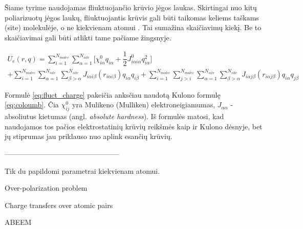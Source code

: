 Šiame tyrime naudojamas fliuktuojančio krūvio jėgos laukas.
Skirtingai nuo kitų poliarizuotų jėgos laukų, fliuktuojantis krūvis gali būti taikomas keliems taškams (site) molekulėje, o ne kiekvienam atomui \cite{polar}.
Tai sumažina skaičiavimų kiekį. Be to skaičiavimai gali būti atlikti tame pačiame žingsnyje.

\begin{multline} \label{eq:fluct_charge}
U_{e}(r, q) = \sum\limits_{i=1}^{N_{molec}} \sum\limits_{\alpha=1}^{N_{site}}
{\bigg[\chi_{i\alpha}^0 q_{i\alpha} + \dfrac{1} {2} J_{i\alpha i\alpha}^0 q_{i\alpha}^2 \bigg]} \\
+ \sum\limits_{i=1}^{N_{molec}} \sum\limits_{\alpha=1}^{N_{site}} \sum\limits_{\beta>\alpha}^{N_{site}}
{J_{i\alpha i\beta} (r_{i\alpha i\beta}) q_{i\alpha} q_{i\beta}}
+ \sum\limits_{i=1}^{N_{molec}} \sum\limits_{j>i}^{N_{molec}} \sum\limits_{\alpha=1}^{N_{site}} \sum\limits_{\beta>\alpha}^{N_{site}}
{J_{i\alpha j\beta} (r_{i\alpha j\beta}) q_{i\alpha} q_{j\beta}}
\end{multline}

Formulė \ref{eq:fluct_charge} pakeičia anksčiau naudotą Kulono formulę \ref{eq:coloumb}.
Čia \(\chi_{ij}^0\) yra Mulikeno (Mulliken) elektroneigiamumas, \(J_{\alpha\alpha}\) - absoliutus kietumas (angl. \textit{absolute hardness}).
Iš formulės matosi, kad naudojamos tos pačios elektrostatinių krūvių reikšmės kaip ir Kulono dėsnyje,
bet jų stiprumas jau priklauso nuo aplink esančių krūvių.


------------------------------------------------

Tik du papildomi parametrai kiekvienam atomui.

Over-polarization problem

Charge transfers over atomic pairs

ABEEM

